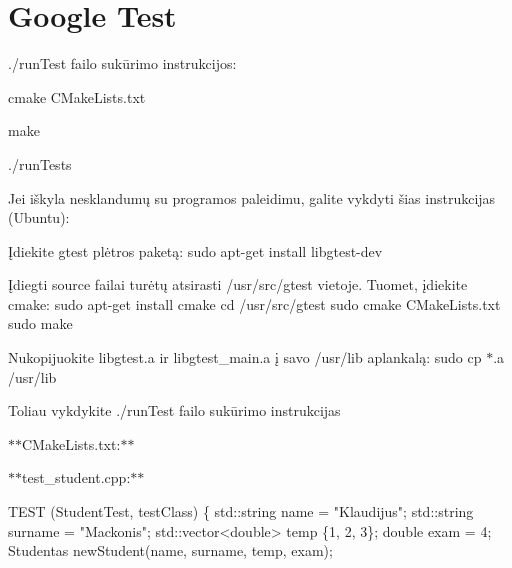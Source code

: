 \section*{Google Test}


\begin{DoxyItemize}
\item {\ttfamily ./run\+Test} failo sukūrimo instrukcijos\+:
\begin{DoxyItemize}
\item {\ttfamily cmake C\+Make\+Lists.\+txt}
\item {\ttfamily make}
\item {\ttfamily ./run\+Tests}
\end{DoxyItemize}
\item Jei iškyla nesklandumų su programos paleidimu, galite vykdyti šias instrukcijas ({\ttfamily Ubuntu})\+:
\begin{DoxyItemize}
\item Įdiekite {\ttfamily gtest} plėtros paketą\+: {\ttfamily sudo apt-\/get install libgtest-\/dev}
\item Įdiegti {\ttfamily source} failai turėtų atsirasti {\ttfamily /usr/src/gtest} vietoje. Tuomet, įdiekite {\ttfamily cmake}\+: {\ttfamily sudo apt-\/get install cmake} {\ttfamily cd /usr/src/gtest} {\ttfamily sudo cmake C\+Make\+Lists.\+txt} {\ttfamily sudo make}
\item Nukopijuokite {\ttfamily libgtest.\+a} ir {\ttfamily libgtest\+\_\+main.\+a} į savo {\ttfamily /usr/lib} aplankalą\+: {\ttfamily sudo cp $\ast$.a /usr/lib}
\item Toliau vykdykite {\ttfamily ./run\+Test} failo sukūrimo instrukcijas
\end{DoxyItemize}
\item $\ast$$\ast${\ttfamily C\+Make\+Lists.\+txt}\+:$\ast$$\ast$ 

\item $\ast$$\ast${\ttfamily test\+\_\+student.\+cpp\+:}$\ast$$\ast$ 
\begin{DoxyCode}
TEST (StudentTest, testClass)
\{
    std::string name = "Klaudijus";
    std::string surname = "Mackonis";
    std::vector<double> temp \{1, 2, 3\};
    double exam = 4;
    Studentas newStudent(name, surname, temp, exam);


\end{DoxyCode}
\end{DoxyItemize}
